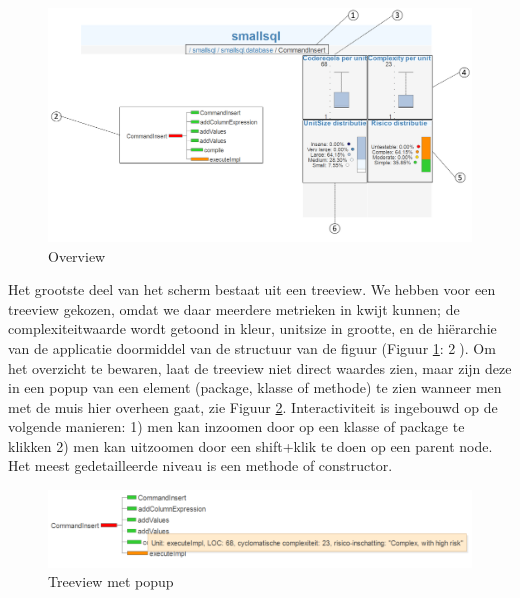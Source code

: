\documentclass[a4paper]{article}
\begin{document}
\begin{figure}[h]
  \includegraphics[width=\linewidth]{images/overview_with_numbers.png}
  \caption{Overview}
  \label{fig:overview}
\end{figure}

Het grootste deel van het scherm bestaat uit een treeview. We hebben voor een treeview gekozen, omdat we daar meerdere metrieken in kwijt kunnen; de complexiteitwaarde wordt getoond in kleur, unitsize in grootte, en de hiërarchie van de applicatie doormiddel van de structuur van de figuur (Figuur \ref{fig:overview}: \textcircled{2}). Om het overzicht te bewaren, laat de treeview niet direct waardes zien, maar zijn deze in een popup van een element (package, klasse of methode) te zien wanneer men met de muis hier overheen gaat, zie Figuur \ref{fig:treeview_popup}. Interactiviteit is ingebouwd op de volgende manieren: 1) men kan inzoomen door op een klasse of package te klikken 2) men kan uitzoomen door een shift+klik te doen op een parent node. Het meest gedetailleerde niveau is een methode of constructor.

\begin{figure}[h]
  \includegraphics[width=\linewidth]{images/treeview_with_popup.png}
  \caption{Treeview met popup}
  \label{fig:treeview_popup}
\end{figure}
\end{document}
